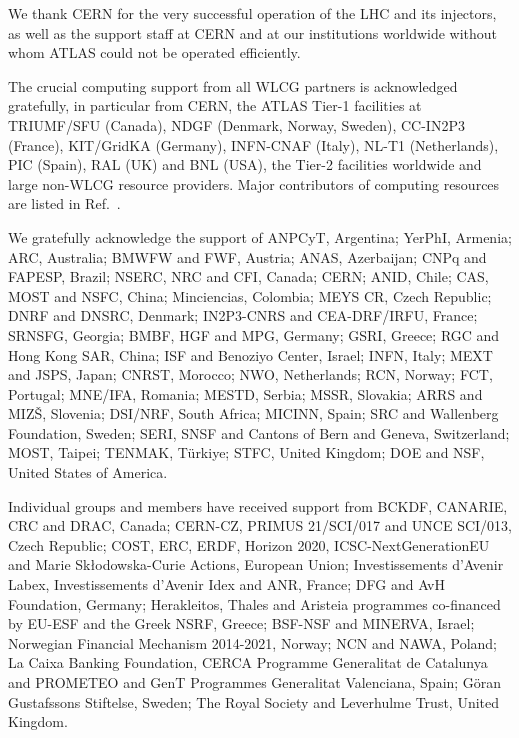 \documentclass[atlasdraft=false, cernpreprint, UKenglish, texmf, orcidlogo]{atlasdoc}
\begin{document}
 
 
We thank CERN for the very successful operation of the LHC and its injectors, as well as the support staff at
CERN and at our institutions worldwide without whom ATLAS could not be operated efficiently.
 
The crucial computing support from all WLCG partners is acknowledged gratefully, in particular from CERN, the ATLAS Tier-1 facilities at TRIUMF/SFU (Canada), NDGF (Denmark, Norway, Sweden), CC-IN2P3 (France), KIT/GridKA (Germany), INFN-CNAF (Italy), NL-T1 (Netherlands), PIC (Spain), RAL (UK) and BNL (USA), the Tier-2 facilities worldwide and large non-WLCG resource providers. Major contributors of computing resources are listed in Ref.~\cite{ATL-SOFT-PUB-2023-001}.
 
We gratefully acknowledge the support of ANPCyT, Argentina; YerPhI, Armenia; ARC, Australia; BMWFW and FWF, Austria; ANAS, Azerbaijan; CNPq and FAPESP, Brazil; NSERC, NRC and CFI, Canada; CERN; ANID, Chile; CAS, MOST and NSFC, China; Minciencias, Colombia; MEYS CR, Czech Republic; DNRF and DNSRC, Denmark; IN2P3-CNRS and CEA-DRF/IRFU, France; SRNSFG, Georgia; BMBF, HGF and MPG, Germany; GSRI, Greece; RGC and Hong Kong SAR, China; ISF and Benoziyo Center, Israel; INFN, Italy; MEXT and JSPS, Japan; CNRST, Morocco; NWO, Netherlands; RCN, Norway; FCT, Portugal; MNE/IFA, Romania; MESTD, Serbia; MSSR, Slovakia; ARRS and MIZ\v{S}, Slovenia; DSI/NRF, South Africa; MICINN, Spain; SRC and Wallenberg Foundation, Sweden; SERI, SNSF and Cantons of Bern and Geneva, Switzerland; MOST, Taipei; TENMAK, T\"urkiye; STFC, United Kingdom; DOE and NSF, United States of America.
 
Individual groups and members have received support from BCKDF, CANARIE, CRC and DRAC, Canada; CERN-CZ, PRIMUS 21/SCI/017 and UNCE SCI/013, Czech Republic; COST, ERC, ERDF, Horizon 2020, ICSC-NextGenerationEU and Marie Sk{\l}odowska-Curie Actions, European Union; Investissements d'Avenir Labex, Investissements d'Avenir Idex and ANR, France; DFG and AvH Foundation, Germany; Herakleitos, Thales and Aristeia programmes co-financed by EU-ESF and the Greek NSRF, Greece; BSF-NSF and MINERVA, Israel; Norwegian Financial Mechanism 2014-2021, Norway; NCN and NAWA, Poland; La Caixa Banking Foundation, CERCA Programme Generalitat de Catalunya and PROMETEO and GenT Programmes Generalitat Valenciana, Spain; G\"{o}ran Gustafssons Stiftelse, Sweden; The Royal Society and Leverhulme Trust, United Kingdom.
 
\end{document}
